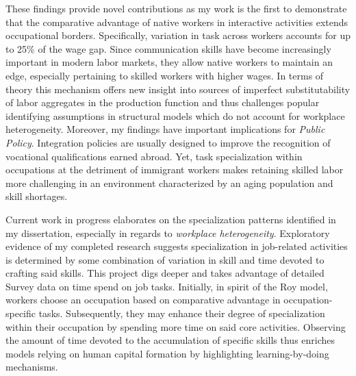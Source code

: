 \documentclass[a4paper,11pt]{article}
\begin{document}
These findings provide novel contributions as my work is the first to demonstrate that the comparative advantage of native workers in interactive activities extends occupational borders. Specifically, variation in task across workers accounts for up to 25\% of the wage gap. Since communication skills have become increasingly important in modern labor markets, they allow native workers to maintain an edge, especially pertaining to skilled workers with higher wages. In terms of theory this mechanism offers new insight into sources of imperfect substitutability of labor aggregates in the production function and thus challenges popular identifying assumptions in structural models which do not account for workplace heterogeneity. Moreover, my findings have important implications for \textit{Public Policy}. Integration policies are usually designed to improve the recognition of vocational qualifications earned abroad. Yet, task specialization within occupations at the detriment of immigrant workers makes retaining skilled labor more challenging in an environment characterized by an aging population and skill shortages.  %

Current work in progress elaborates on the specialization patterns identified in my dissertation, especially in regards to \textit{workplace heterogeneity}. Exploratory evidence of my completed research suggests specialization in job-related activities is determined by some combination of variation in skill and time devoted to crafting said skills. This project digs deeper and takes advantage of detailed Survey data on time spend on job tasks. Initially, in spirit of the Roy model, workers choose an occupation based on comparative advantage in occupation-specific tasks. Subsequently, they may enhance their degree of specialization within their occupation by spending more time on said core activities. Observing the amount of time devoted to the accumulation of specific skills thus enriches models relying on human capital formation by highlighting learning-by-doing mechanisms.
\end{document}
